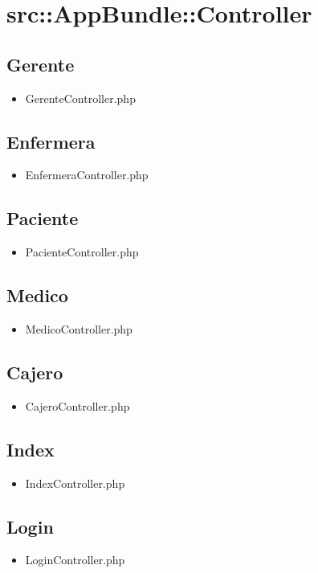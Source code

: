 	\section{src::AppBundle::Controller}
	\subsection{Gerente}
	\begin{itemize}
		\item GerenteController.php
	\end{itemize}
	\subsection{Enfermera}
	\begin{itemize}
		\item EnfermeraController.php
	\end{itemize}
	\subsection{Paciente}
	\begin{itemize}
		\item PacienteController.php
	\end{itemize}
	\subsection{Medico}
	\begin{itemize}
		\item MedicoController.php
	\end{itemize}
	\subsection{Cajero}
	\begin{itemize}
		\item CajeroController.php
	\end{itemize}
	\subsection{Index}
	\begin{itemize}
		\item IndexController.php
	\end{itemize}
	\subsection{Login}
	\begin{itemize}
		\item LoginController.php
	\end{itemize}
